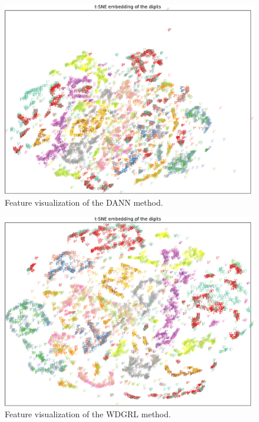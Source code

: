 \documentclass{article} %
\begin{document}
\begin{figure}[h]
	\centering
	\includegraphics[width=0.7\linewidth]{figs/dann-36300emb-st}
	\caption{Feature visualization of the DANN method.}
	\label{fig:t-nse-dann}
\end{figure}

\begin{figure}[h]
	\centering
	\includegraphics[width=0.7\linewidth]{figs/wd-20000emb-st}
	\caption{Feature visualization of the WDGRL method.}
	\label{fig:t-nse-wd}
\end{figure}
\end{document}

